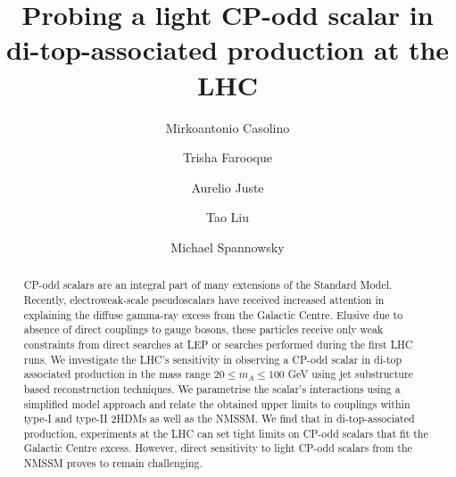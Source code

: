 \documentclass[preprintnumbers,superscriptaddress,nofootinbib,aps,prd,floatfix]{revtex4}
\begin{document}
\title{Probing a light CP-odd scalar in di-top-associated production at the LHC}

\begin{abstract}
\noindent 
CP-odd scalars are an integral part of many extensions of the Standard Model. Recently, electroweak-scale pseudoscalars have received increased attention in explaining the diffuse gamma-ray excess from the Galactic Centre.
Elusive due to absence of direct couplings to gauge bosons, these particles receive only weak constraints from direct searches at LEP or searches performed during the first LHC runs. We investigate the LHC's sensitivity in observing a CP-odd scalar in di-top associated production in the mass range $20 \leq m_A \leq 100$ GeV using jet substructure based reconstruction techniques. We parametrise the scalar's interactions using a simplified model approach and relate the 
obtained upper limits to couplings within type-I and type-II 2HDMs as well as the NMSSM. We find that in di-top-associated production, experiments at the LHC can set tight limits on CP-odd scalars that fit the Galactic Centre excess.  However, direct sensitivity to light CP-odd scalars from the NMSSM proves to remain challenging.  
\end{abstract}

\author{Mirkoantonio Casolino}

\author{Trisha Farooque}

\author{Aurelio Juste}

\author{Tao Liu}
%
\author{Michael Spannowsky}
%

\pacs{}


\maketitle
\end{document}
